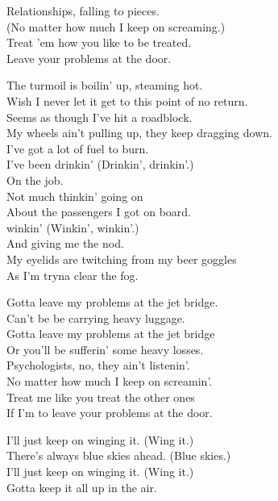 Relationships, falling to pieces. \\
(No matter how much I keep on screaming.) \\
Treat 'em how you like to be treated. \\
Leave your problems at the door. \\


The turmoil is boilin' up, steaming hot. \\
Wish I never let it get to this point of no return. \\
Seems as though I've hit a roadblock. \\
My wheels ain't pulling up, they keep dragging down. \\

I've got a lot of fuel to burn. \\
I've been drinkin' (Drinkin', drinkin'.) \\
On the job. \\
Not much thinkin' going on \\
About the passengers I got on board. \\

 winkin' (Winkin', winkin'.) \\
And giving me the nod. \\
My eyelids are twitching from my beer goggles \\
As I'm tryna clear the fog. \\


Gotta leave my problems at the jet bridge. \\
Can't be be carrying heavy luggage. \\
Gotta leave my problems at the jet bridge \\
Or you'll be sufferin' some heavy losses. \\

Psychologists, no, they ain't listenin'. \\
No matter how much I keep on screamin'. \\
Treat me like you treat the other ones \\
If I'm to leave your problems at the door. \\


I'll just keep on winging it. (Wing it.) \\
There's always blue skies ahead. (Blue skies.) \\
I'll just keep on winging it. (Wing it.) \\
Gotta keep it all up in the air. \\

